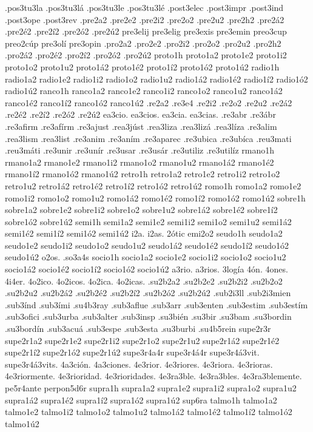 {.pos3tu3la
.pos3tu3lá
.pos3tu3le
.pos3tu3lé
.post3elec
.post3impr
.post3ind
.post3ope
.post3rev
.pre2a2
.pre2e2
.pre2i2
.pre2o2
.pre2u2
.pre2h2
.pre2á2
.pre2é2
.pre2í2
.pre2ó2
.pre2ú2
pre3elij
pre3elig
pre3exis
pre3emin
preo3cup
preo2cúp
pre3olí
pre3opin
.pro2a2
.pro2e2
.pro2i2
.pro2o2
.pro2u2
.pro2h2
.pro2á2
.pro2é2
.pro2í2
.pro2ó2
.pro2ú2
proto1h
proto1a2 proto1e2 proto1i2 proto1o2 proto1u2
proto1á2 proto1é2 proto1í2 proto1ó2 proto1ú2
radio1h
radio1a2 radio1e2 radio1i2 radio1o2 radio1u2
radio1á2 radio1é2 radio1í2 radio1ó2 radio1ú2
ranco1h
ranco1a2 ranco1e2 ranco1i2 ranco1o2 ranco1u2
ranco1á2 ranco1é2 ranco1í2 ranco1ó2 ranco1ú2
.re2a2
.re3e4
.re2i2
.re2o2
.re2u2
.re2á2
.re2é2
.re2í2
.re2ó2
.re2ú2
ea3cio.
ea3cios.
ea3cia.
ea3cias.
.re3abr
.re3ábr
.re3afirm
.re3afírm
.re3ajust
.rea3júst
.rea3liza
.rea3lizá
.rea3líza
.re3alim
.rea3lism
.rea3list
.re3anim
.re3aním
.re3aparec
.re3ubica
.re3ubíca
.reu3mati
.reu3máti
.re3unir
.re3unír
.re3usar
.re3usár
.re3utiliz
.re3utilíz
rmano1h
rmano1a2 rmano1e2 rmano1i2 rmano1o2 rmano1u2
rmano1á2 rmano1é2 rmano1í2 rmano1ó2 rmano1ú2
retro1h
retro1a2 retro1e2 retro1i2 retro1o2 retro1u2
retro1á2 retro1é2 retro1í2 retro1ó2 retro1ú2
romo1h
romo1a2 romo1e2 romo1i2 romo1o2 romo1u2
romo1á2 romo1é2 romo1í2 romo1ó2 romo1ú2
sobre1h
sobre1a2 sobre1e2 sobre1i2 sobre1o2 sobre1u2
sobre1á2 sobre1é2 sobre1í2 sobre1ó2 sobre1ú2
semi1h
semi1a2 semi1e2 semi1i2 semi1o2 semi1u2
semi1á2 semi1é2 semi1í2 semi1ó2 semi1ú2
i2a.
i2as.
2ótic
emi2o2
seudo1h
seudo1a2 seudo1e2 seudo1i2 seudo1o2 seudo1u2
seudo1á2 seudo1é2 seudo1í2 seudo1ó2 seudo1ú2
o2os.
.so3a4s
socio1h
socio1a2 socio1e2 socio1i2 socio1o2 socio1u2
socio1á2 socio1é2 socio1í2 socio1ó2 socio1ú2
a3rio.
a3rios.
3logía
4ón.
4ones.
4i4er.
4o2ico.
4o2icos.
4o2ica.
4o2icas.
.su2b2a2
.su2b2e2
.su2b2i2
.su2b2o2
.su2b2u2
.su2b2á2
.su2b2é2
.su2b2í2
.su2b2ó2
.su2b2ú2
.sub2i3ll
.sub2i3mien
.sub3índ
.sub3ími
.su4b3ray
.sub3aflue
.sub3arr
.sub3enten
.sub3estim
.sub3estím
.sub3ofici
.sub3urba
.sub3alter
.sub3insp
.su3bién
.su3bir
.su3bam
.su3bordin
.su3bordín
.sub3acuá
.sub3espe
.sub3esta
.su3burbi
.su4b5rein
supe2r3r
supe2r1a2 supe2r1e2 supe2r1i2 supe2r1o2 supe2r1u2
supe2r1á2 supe2r1é2 supe2r1í2 supe2r1ó2 supe2r1ú2
supe3r4a4r
supe3r4á4r
supe3r4á3vit.
supe3r4á3vits.
4a3ción.
4a3ciones.
4e3rior.
4e3riores.
4e3riora.
4e3rioras.
4e3riormente.
4e3rioridad.
4e3rioridades.
4e3ra3ble.
4e3ra3bles.
4e3ra3blemente.
pe5r4ante
perpon5d6r
supra1h
supra1a2 supra1e2 supra1i2 supra1o2 supra1u2
supra1á2 supra1é2 supra1í2 supra1ó2 supra1ú2
sup6ra
talmo1h
talmo1a2 talmo1e2 talmo1i2 talmo1o2 talmo1u2
talmo1á2 talmo1é2 talmo1í2 talmo1ó2 talmo1ú2
}
